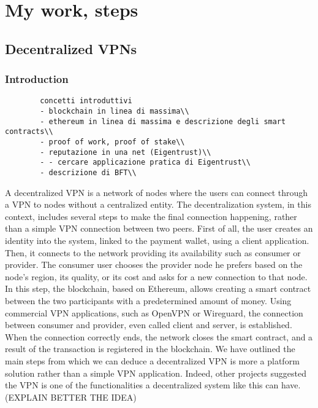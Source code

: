 \documentclass[]{article}
\begin{document}
	\section{My work, steps}
	\subsection{Decentralized VPNs}
	\subsubsection{Introduction}
		
	\begin{verbatim}
		concetti introduttivi
		- blockchain in linea di massima\\
		- ethereum in linea di massima e descrizione degli smart contracts\\
		- proof of work, proof of stake\\
		- reputazione in una net (Eigentrust)\\
		- - cercare applicazione pratica di Eigentrust\\
		- descrizione di BFT\\
	\end{verbatim}

	A decentralized VPN is a network of nodes where the users can connect through a VPN to nodes without a centralized entity. The decentralization system, in this context, includes several steps to make the final connection happening, rather than a simple VPN connection between two peers.
	First of all, the user creates an identity into the system, linked to the payment wallet, using a client application. Then, it connects to the network providing its availability such as consumer or provider. The consumer user chooses the provider node he prefers based on the node's region, its quality, or its cost and asks for a new connection to that node. In this step, the blockchain, based on Ethereum, allows creating a smart contract between the two participants with a predetermined amount of money. Using commercial VPN applications, such as OpenVPN or Wireguard, the connection between consumer and provider, even called client and server, is established. When the connection correctly ends, the network closes the smart contract, and a result of the transaction is registered in the blockchain. 
	We have outlined the main steps from which we can deduce a decentralized VPN is more a platform solution rather than a simple VPN application. Indeed, other projects suggested the VPN is one of the functionalities a decentralized system like this can have. (EXPLAIN BETTER THE IDEA)  
		          
\end{document}
